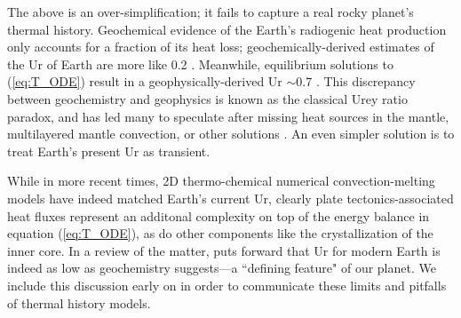 The above is an over-simplification; it fails to capture a real rocky planet's thermal history. Geochemical evidence of the Earth's radiogenic heat production only accounts for a fraction of its heat loss; geochemically-derived estimates of the Ur of Earth are more like 0.2 \citep{Korenaga2008a}. Meanwhile, equilibrium solutions to (\ref{eq:T_ODE}) result in a geophysically-derived Ur $\sim$0.7 \citep{Schubert1980, McKenzie1981}. This discrepancy between geochemistry and geophysics is known as the classical Urey ratio paradox, and has led many to speculate after missing heat sources in the mantle, multilayered mantle convection, or other solutions \citep[see review in][]{Korenaga2008a}. An even simpler solution is to treat Earth's present Ur as transient.

While in more recent times, 2D thermo-chemical numerical convection-melting models \citep{Nakagawa2012} have indeed matched Earth's current Ur, clearly plate tectonics-associated heat fluxes represent an additonal complexity on top of the energy balance in equation (\ref{eq:T_ODE}), as do other components like the crystallization of the inner core. %
In a review of the matter, \citet{Korenaga2008a} puts forward that Ur for modern Earth is indeed as low as geochemistry suggests---a ``defining feature" of our planet. We include this discussion early on in order to communicate these limits and pitfalls of thermal history models.



